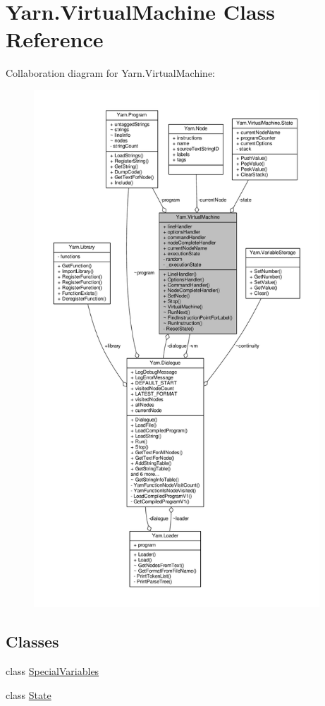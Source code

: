 \hypertarget{a00138}{\section{Yarn.\-Virtual\-Machine Class Reference}
\label{a00138}
}


Collaboration diagram for Yarn.\-Virtual\-Machine\-:
\nopagebreak
\begin{figure}[H]
\begin{center}
\leavevmode
\includegraphics[height=550pt]{d1/daa/a00638}
\end{center}
\end{figure}
\subsection*{Classes}
\begin{DoxyCompactItemize}
\item 
class \hyperlink{a00138_de/de9/a00322}{Special\-Variables}
\item 
class \hyperlink{a00141}{State}
\end{DoxyCompactItemize}
